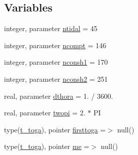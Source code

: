 \subsection*{Variables}
\begin{DoxyCompactItemize}
\item 
integer, parameter \mbox{\hyperlink{namespacemoduletoga_ae4b0b997b6803ae8647fdd97f2dda666}{ntidal}} = 45
\item 
integer, parameter \mbox{\hyperlink{namespacemoduletoga_a151be23f63401a1bb1a76f0a4c30d9ca}{ncompt}} = 146
\item 
integer, parameter \mbox{\hyperlink{namespacemoduletoga_a06e41646ba24c11ab2e1b513e5c1760c}{nconsh1}} = 170
\item 
integer, parameter \mbox{\hyperlink{namespacemoduletoga_a839ff93f37eef8183b7f13edc4952154}{nconsh2}} = 251
\item 
real, parameter \mbox{\hyperlink{namespacemoduletoga_a37e0b58aa055e5f38ec1c3a3b5abcdd0}{dthora}} = 1. / 3600.
\item 
real, parameter \mbox{\hyperlink{namespacemoduletoga_a0391f4a969edf3e4f5f56b9ad111d6d0}{twopi}} = 2. $\ast$ PI
\item 
type(\mbox{\hyperlink{structmoduletoga_1_1t__toga}{t\+\_\+toga}}), pointer \mbox{\hyperlink{namespacemoduletoga_affe7bb283aa5a25e766ceedfd0cfe3bd}{firsttoga}} =$>$ null()
\item 
type(\mbox{\hyperlink{structmoduletoga_1_1t__toga}{t\+\_\+toga}}), pointer \mbox{\hyperlink{namespacemoduletoga_ae189511573cac5c5cde7e675f45dd4c0}{me}} =$>$ null()
\item 

\end{DoxyCompactItemize}
